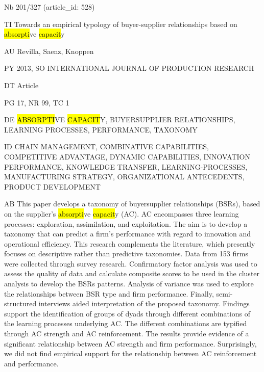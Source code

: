\documentclass[a4paper]{article}
\begin{document}
\vspace*{-2cm}
Nb \tabto{0cm}201/327 (article\_id: 528)\par
TI \tabto{0cm}Towards an empirical typology of buyer-supplier relationships based on \hl{absorpti}ve \hl{capacit}y\par
AU \tabto{0cm}Revilla, Saenz, Knoppen\par
PY \tabto{0cm}2013, SO INTERNATIONAL JOURNAL OF PRODUCTION RESEARCH\par
DT \tabto{0cm}Article\par
PG \tabto{0cm}17, NR 99, TC 1\par
DE \tabto{0cm}\hl{ABSORPTI}VE \hl{CAPACIT}Y, BUYERSUPPLIER RELATIONSHIPS, LEARNING PROCESSES, PERFORMANCE, TAXONOMY\par
ID \tabto{0cm}CHAIN MANAGEMENT, COMBINATIVE CAPABILITIES, COMPETITIVE ADVANTAGE, DYNAMIC CAPABILITIES, INNOVATION PERFORMANCE, KNOWLEDGE TRANSFER, LEARNING-PROCESSES, MANUFACTURING STRATEGY, ORGANIZATIONAL ANTECEDENTS, PRODUCT DEVELOPMENT\par
AB \tabto{0cm}This paper develops a taxonomy of buyersupplier relationships (BSRs), based on the supplier's \hl{absorpti}ve \hl{capacit}y (AC). AC encompasses three learning processes: exploration, assimilation, and exploitation. The aim is to develop a taxonomy that can predict a firm's performance with regard to innovation and operational efficiency. This research complements the literature, which presently focuses on descriptive rather than predictive taxonomies. Data from 153 firms were collected through survey research. Confirmatory factor analysis was used to assess the quality of data and calculate composite scores to be used in the cluster analysis to develop the BSRs patterns. Analysis of variance was used to explore the relationships between BSR type and firm performance. Finally, semi-structured interviews aided interpretation of the proposed taxonomy. Findings support the identification of groups of dyads through different combinations of the learning processes underlying AC. The different combinations are typified through AC strength and AC reinforcement. The results provide evidence of a significant relationship between AC strength and firm performance. Surprisingly, we did not find empirical support for the relationship between AC reinforcement and performance.\par
\clearpage
\end{document}
